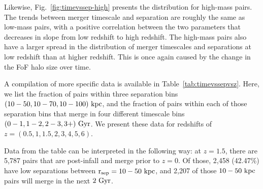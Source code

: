 \documentclass[twocolumn,linenumbers]{aastex631}
\begin{document}
    Likewise, Fig.~\ref{fig:timevssep-high} presents the distribution for high-mass pairs.
    The trends between merger timescale and separation are roughly the same as low-mass pairs, with a positive correlation between the two parameters that decreases in slope from low redshift to high redshift. 
    The high-mass pairs also have a larger spread in the distribution of merger timescales and separations at low redshift than at higher redshift.
    This is once again caused by the change in the FoF halo size over time. 
    
    
    A compilation of more specific data is available in Table~\ref{tab:timevssepvsz}.
    Here, we list the fraction of pairs within three separation bins $(10-50, 10-70, 10-100)\,\mathrm{\,kpc}$, and the fraction of pairs within each of those separation bins that merge in four different timescale bins $(0-1, 1-2, 2-3, 3+)\,\mathrm{\,Gyr}$.
    We present these data for redshifts of $z=(0.5,1,1.5,2,3,4,5,6)$.
    
    Data from the table can be interpreted in the following way: at $z=1.5$, there are 5,787 pairs that are post-infall and merge prior to $z=0$. 
    Of those, 2,458 (42.47\%) have low separations between $\rm r_{sep}=10-50\,\mathrm{\,kpc}$, and 2,207 of those $10-50\,\mathrm{\,kpc}$ pairs will merge in the next $2\,\mathrm{\,Gyr}$. 
    
\end{document}
